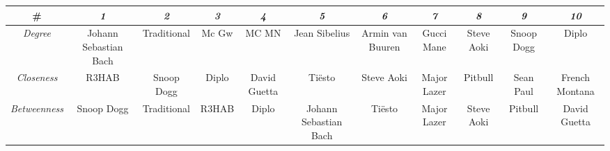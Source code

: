 
\begin{table}[]
    \begin{tabular}{|c|c|c|c|c|c|c|c|c|c|c|}
    \hline
    \textbf{\#}           & \textit{\textbf{1}}                                        & \textit{\textbf{2}}                                         & \textit{\textbf{3}}                                           & \textit{\textbf{4}}                                         & \textit{\textbf{5}}                                    & \textit{\textbf{6}}                                             & \textit{\textbf{7}}                                      & \textit{\textbf{8}}                                     & \textit{\textbf{9}}                                    & \textit{\textbf{10}}                                      \\ \hline
    \textit{Degree}       & Johann Sebastian Bach                                      & Traditional                                                 & Mc Gw                                                         & MC MN                                                       & Jean Sibelius                                          & Armin van Buuren                                                & Gucci Mane                                               & Steve Aoki                                              & Snoop Dogg                                             & Diplo                                                     \\ \hline
    \textit{Closeness}    & R3HAB                                                      & Snoop Dogg                                                  & Diplo                                                         & David Guetta                                                & Tiësto                                                 & Steve Aoki                                                      & Major Lazer                                              & Pitbull                                                 & Sean Paul                                              & French Montana                                            \\ \hline
    \textit{Betweenness}  & Snoop Dogg                                                 & Traditional                                                 & R3HAB                                                         & Diplo                                                       & Johann Sebastian Bach                                  & Tiësto                                                          & Major Lazer                                              & Steve Aoki                                              & Pitbull                                                & David Guetta                                              \\ \hline

\end{tabular}
\end{table}
